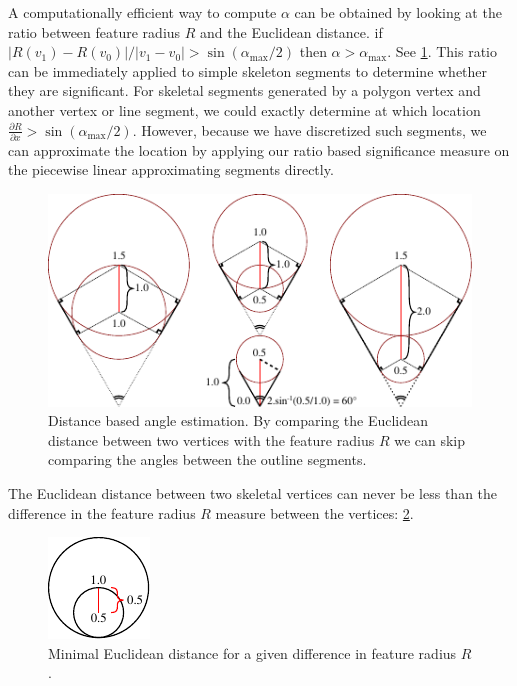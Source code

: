 A computationally efficient way to compute $\alpha$ can be obtained by looking at the ratio between feature radius $R$ and the Euclidean distance.
if $ | R(v_1) - R(v_0) | / |v_1 - v_0| >  \sin(\alpha_\text{max} / 2)$ then $\alpha > \alpha_\text{max}$.
See \cref{distance_based_angles}.
This ratio can be immediately applied to simple skeleton segments to determine whether they are significant.
For skeletal segments generated by a polygon vertex and another vertex or line segment, we could exactly determine at which location $\frac{\partial R}{\partial x} > \sin(\alpha_\text{max} / 2)$.
However, because we have discretized such segments, we can approximate the location by applying our ratio based significance measure on the piecewise linear approximating segments directly.

\begin{figure}
\centering
\includegraphics[width=.9\columnwidth]{sources/method/distance_based_angles.pdf}
\caption{
Distance based angle estimation.
By comparing the Euclidean distance between two vertices with the feature radius $R$ we can skip comparing the angles between the outline segments.
}
\label{distance_based_angles}
\end{figure}

The Euclidean distance between two skeletal vertices can never be less than the difference in the feature radius $R$ measure between the vertices: \cref{distance_ratio_limit}.

\begin{figure}
\centering
\includegraphics[width=.3\columnwidth]{sources/method/distance_ratio_limit.pdf}
\caption{Minimal Euclidean distance for a given difference in feature radius $R$.}
\label{distance_ratio_limit}
\end{figure}

